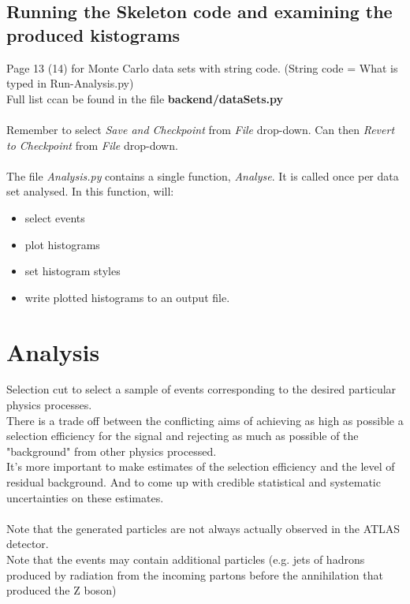 \documentclass[11pt]{article}
\newcommand{\<}{\guilsinglleft}
\renewcommand{\>}{\guilsinglright}
\begin{document}
    \subsection{Running the Skeleton code and examining the produced kistograms}
    Page 13 (14) for Monte Carlo data sets with string code.  (String code = What is typed in Run-Analysis.py)\\
    Full list ccan be found in the file \textbf{backend/dataSets.py}\\
    \\
    Remember to select \textit{Save and Checkpoint} from \textit{File} drop-down.
    Can then \textit{Revert to Checkpoint} from \textit{File} drop-down.
    \\\\
    The file \textit{Analysis.py} contains a single function, \textit{Analyse}.
    It is called once per data set analysed.
    In this function, will:
    \begin{itemize}
        \item select events
        \item plot histograms
        \item set histogram styles
        \item write plotted histograms to an output file.
    \end{itemize}

    \section{Analysis}

    Selection cut to select a sample of events corresponding to the desired particular physics processes.\\
    There is a trade off  between  the conflicting aims of achieving as high as possible a selection efficiency for the signal and rejecting as much as possible of the "background" from other physics processed.\\
    It's more important to make estimates of the selection efficiency and the level of residual background.
    And to come up with credible statistical and systematic uncertainties on these estimates.
    \\\\
    Note that the generated particles are not always actually observed in  the ATLAS detector.\\
    Note that the events may contain additional particles (e.g. jets of hadrons produced by radiation from the incoming partons before the annihilation that produced the Z boson)
\end{document}
